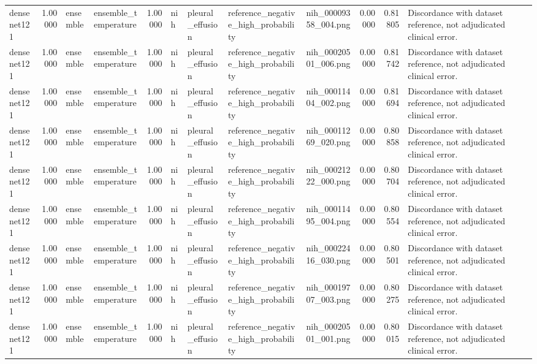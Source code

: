 \begin{tabular}{lrllrllllrrl}
densenet121 & 1.00000 & ensemble & ensemble\_temperature & 1.00000 & nih & pleural\_effusion & reference\_negative\_high\_probability & nih\_00009358\_004.png & 0.00000 & 0.81805 & Discordance with dataset reference, not adjudicated clinical error. \\
densenet121 & 1.00000 & ensemble & ensemble\_temperature & 1.00000 & nih & pleural\_effusion & reference\_negative\_high\_probability & nih\_00020501\_006.png & 0.00000 & 0.81742 & Discordance with dataset reference, not adjudicated clinical error. \\
densenet121 & 1.00000 & ensemble & ensemble\_temperature & 1.00000 & nih & pleural\_effusion & reference\_negative\_high\_probability & nih\_00011404\_002.png & 0.00000 & 0.81694 & Discordance with dataset reference, not adjudicated clinical error. \\
densenet121 & 1.00000 & ensemble & ensemble\_temperature & 1.00000 & nih & pleural\_effusion & reference\_negative\_high\_probability & nih\_00011269\_020.png & 0.00000 & 0.80858 & Discordance with dataset reference, not adjudicated clinical error. \\
densenet121 & 1.00000 & ensemble & ensemble\_temperature & 1.00000 & nih & pleural\_effusion & reference\_negative\_high\_probability & nih\_00021222\_000.png & 0.00000 & 0.80704 & Discordance with dataset reference, not adjudicated clinical error. \\
densenet121 & 1.00000 & ensemble & ensemble\_temperature & 1.00000 & nih & pleural\_effusion & reference\_negative\_high\_probability & nih\_00011495\_004.png & 0.00000 & 0.80554 & Discordance with dataset reference, not adjudicated clinical error. \\
densenet121 & 1.00000 & ensemble & ensemble\_temperature & 1.00000 & nih & pleural\_effusion & reference\_negative\_high\_probability & nih\_00022416\_030.png & 0.00000 & 0.80501 & Discordance with dataset reference, not adjudicated clinical error. \\
densenet121 & 1.00000 & ensemble & ensemble\_temperature & 1.00000 & nih & pleural\_effusion & reference\_negative\_high\_probability & nih\_00019707\_003.png & 0.00000 & 0.80275 & Discordance with dataset reference, not adjudicated clinical error. \\
densenet121 & 1.00000 & ensemble & ensemble\_temperature & 1.00000 & nih & pleural\_effusion & reference\_negative\_high\_probability & nih\_00020501\_001.png & 0.00000 & 0.80015 & Discordance with dataset reference, not adjudicated clinical error. \\

\end{tabular}
